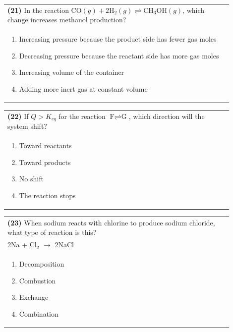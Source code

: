\documentclass{article}
\begin{document}
\noindent\begin{tabular}{|p{0.9\linewidth}|}
\hline
\textbf{(21)} In the reaction $\text{CO}(g) + 2\text{H}_2(g) \rightleftharpoons \text{CH}_3\text{OH}(g)$, which change increases methanol production? \\[0.2cm]
\begin{minipage}[t]{0.85\linewidth}
\begin{enumerate}[label=\alph*.]
\item Increasing pressure because the product side has fewer gas moles
\item Decreasing pressure because the reactant side has more gas moles
\item Increasing volume of the container
\item Adding more inert gas at constant volume
\end{enumerate}
\end{minipage}\\[0.2cm]
\hline
\end{tabular}


\noindent\begin{tabular}{|p{0.9\linewidth}|}
\hline
\textbf{(22)} If $Q > K_{eq}$ for the reaction $\text{F} \rightleftharpoons \text{G}$, which direction will the system shift?\\[0.2cm]
\begin{minipage}[t]{0.85\linewidth}
\begin{enumerate}[label=\alph*.]
\item Toward reactants
\item Toward products
\item No shift
\item The reaction stops
\end{enumerate}
\end{minipage}\\[0.2cm]
\hline
\end{tabular}

\noindent\begin{tabular}{|p{0.9\linewidth}|}
\hline
\textbf{(23)} When sodium reacts with chlorine to produce sodium chloride, what type of reaction is this?\\[0.2cm]
2Na + Cl$_2$ $\rightarrow$ 2NaCl\\[0.2cm]
\begin{minipage}[t]{0.85\linewidth}
\begin{enumerate}[label=\alph*.]
\item Decomposition
\item Combustion
\item Exchange
\item Combination
\end{enumerate}
\end{minipage}\\[0.2cm]
\hline
\end{tabular}
\end{document}
